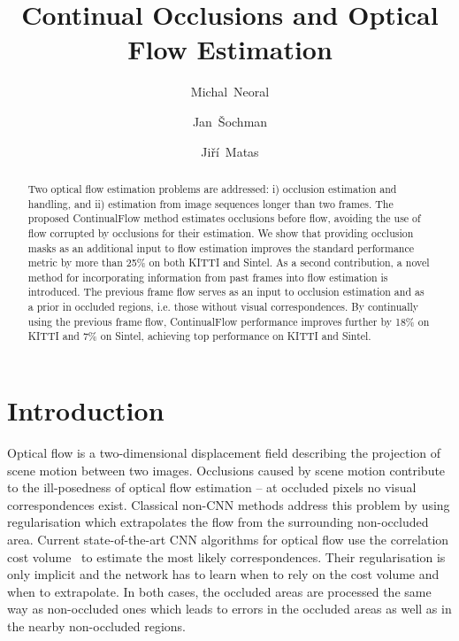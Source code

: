 \documentclass[runningheads]{llncs}
\begin{document}
\title{Continual Occlusions and Optical Flow Estimation}  





\author{Michal~Neoral \and Jan~Šochman \and Jiří~Matas}








\maketitle

\begin{abstract}
Two optical flow estimation problems are addressed: i) occlusion estimation and handling, and ii) estimation from image sequences longer than two frames. 
The proposed ContinualFlow method estimates occlusions before flow, avoiding the use of flow corrupted by occlusions for their estimation.
We show that providing occlusion masks as an additional input to flow estimation improves the standard performance metric by more than 25\% on both KITTI and Sintel.
As a second contribution, a novel method for  incorporating information from past frames into flow estimation is introduced.
The previous frame flow serves as an input to occlusion estimation and as a prior in occluded regions, i.e. those without visual correspondences.
By continually using the previous frame flow, ContinualFlow performance improves further by 18\% on KITTI and 7\% on Sintel, achieving top performance on KITTI and Sintel.
\end{abstract}





\section{Introduction}
\label{sec:intro}
Optical flow is a two-dimensional displacement field describing the projection of scene motion between two images.
Occlusions caused by scene motion contribute to the ill-posedness of  optical flow estimation -- at occluded pixels no visual correspondences exist.
Classical non-CNN methods address this problem by using regularisation which extrapolates the flow from the surrounding non-occluded area.
Current state-of-the-art CNN algorithms for optical flow use the correlation cost volume~\cite{Dosovitskiy2015,Ilg2016,Ranjan2016,Sun2017,Meister2017,Hui2018} to estimate the most likely correspondences.
Their regularisation is only implicit and the network has to learn when to rely on the cost volume and  when to extrapolate. 
In both cases, the occluded areas are processed the same way as non-occluded ones which leads to errors in the occluded areas as well as in the nearby non-occluded regions.
 
\end{document}
